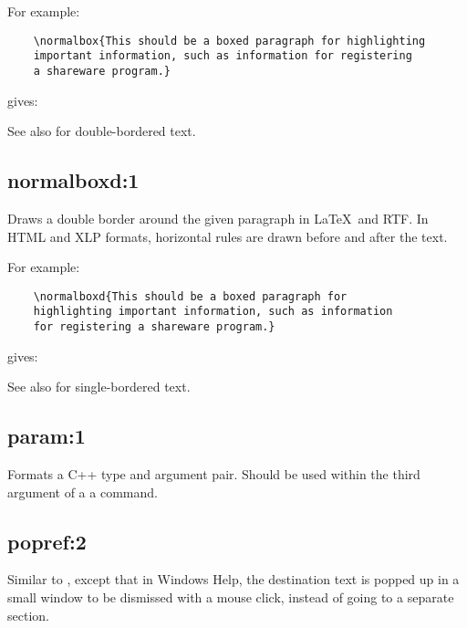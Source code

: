For example:

\begin{verbatim}
    \normalbox{This should be a boxed paragraph for highlighting
    important information, such as information for registering
    a shareware program.}
\end{verbatim}

gives:


See also  for double-bordered text.

\subsection*{normalboxd:1}\label{normalboxd}

Draws a double border around the given paragraph in \LaTeX\ and RTF. In
HTML and XLP formats, horizontal rules are drawn before and after the
text.

For example:

\begin{verbatim}
    \normalboxd{This should be a boxed paragraph for
    highlighting important information, such as information
    for registering a shareware program.}
\end{verbatim}

gives:


See also  for single-bordered text.

\subsection*{param:1}\label{param}

Formats a C++ type and argument pair. Should be used within the third argument
of a a  command.

\subsection*{popref:2}\label{popref}

Similar to , except that in Windows Help,
the destination text is popped up in a small window to be dismissed with
a mouse click, instead of going to a separate section.

